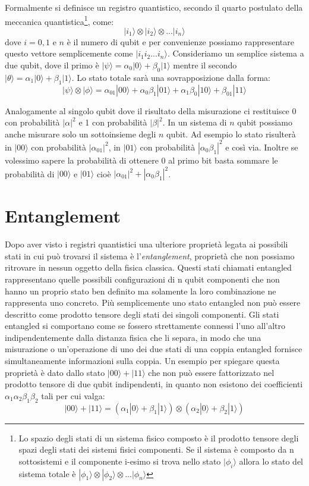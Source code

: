 Formalmente si definisce un registro quantistico, secondo il quarto postulato della meccanica quantistica\footnote{Lo spazio degli stati di un sistema fisico composto è il prodotto tensore degli spazi degli stati dei sistemi fisici componenti. Se il sistema è composto da n sottosistemi e il componente i-esimo si trova nello stato \( | \phi _i \rangle \) allora lo stato del sistema totale è \( | \phi _1 \rangle \otimes | \phi _2 \rangle \otimes ... | \phi _n \rangle \)}, come:
\[
  | i _1 \rangle \otimes | i _2 \rangle \otimes ... | i _n \rangle
\]
dove \(i = 0,1\) e \(n\) è il numero di qubit e per convenienze possiamo rappresentare questo vettore semplicemente come \( | i _1 i _2 ... i _n \rangle \). Consideriamo un semplice sistema a due qubit, dove il primo è \( |\psi \rangle  = \alpha _0 |0 \rangle  + \beta _0 |1 \rangle \)  mentre il secondo \( |\theta \rangle  = \alpha _1 | 0 \rangle  + \beta _1 | 1 \rangle \). Lo stato totale sarà una sovrapposizione dalla forma:
\[
  | \psi \rangle \otimes | \phi \rangle 
  = \alpha _{01} | 00 \rangle 
  + \alpha _0 \beta _1 | 01 \rangle 
  + \alpha _1 \beta _0 | 10 \rangle 
  +  \beta _{01} | 11 \rangle  
\]

Analogamente al singolo qubit dove il risultato della misurazione ci restituisce 0 con probabilità \( |\alpha|^2 \) e 1 con probabilità \( |\beta|^2 \). In un sistema di \(n\) qubit possiamo anche misurare solo un sottoinsieme degli \(n\) qubit. Ad esempio lo stato risulterà in \(| 00 \rangle \) con probabilità \( | \alpha _{01}|^2 \), in \(| 01 \rangle \) con probabilità \( | \alpha _0 \beta _1|^2 \) e così via. Inoltre se volessimo sapere la probabilità di ottenere 0 al primo bit basta sommare le probabilità di \(| 00 \rangle \) e \(| 01 \rangle \) cioè \( |\alpha _{01}|^2 + |\alpha _0 \beta _1|^2 \).

\section{Entanglement}
Dopo aver visto i registri quantistici una ulteriore proprietà legata ai possibili stati in cui può trovarsi il sistema è l'\textit{entanglement}, proprietà che non possiamo ritrovare in nessun oggetto della fisica classica. Questi stati chiamati entangled rappresentano quelle possibili configurazioni di n qubit componenti che non hanno un proprio stato ben definito ma solamente la loro combinazione ne rappresenta uno concreto. Più semplicemente uno stato entangled non può essere descritto come prodotto tensore degli stati dei singoli componenti.
Gli stati entangled si comportano come se fossero strettamente connessi l'uno all'altro indipendentemente dalla distanza fisica che li separa, in modo che una misurazione o un'operazione di uno dei due stati di una coppia entangled fornisce simultaneamente informazioni sulla coppia.
Un esempio per spiegare questa proprietà è dato dallo stato \( | 00 \rangle + | 11 \rangle \) che non può essere fattorizzato nel prodotto tensore di due qubit indipendenti, in quanto non esistono dei coefficienti \( \alpha _1 \alpha _2 \beta _1 \beta _2 \) tali per cui valga:
\[
  | 00 \rangle + | 11 \rangle
  = ( \alpha _1 | 0 \rangle + \beta _1 | 1 \rangle) \otimes ( \alpha _2 | 0 \rangle + \beta _2 | 1 \rangle)  
\]

